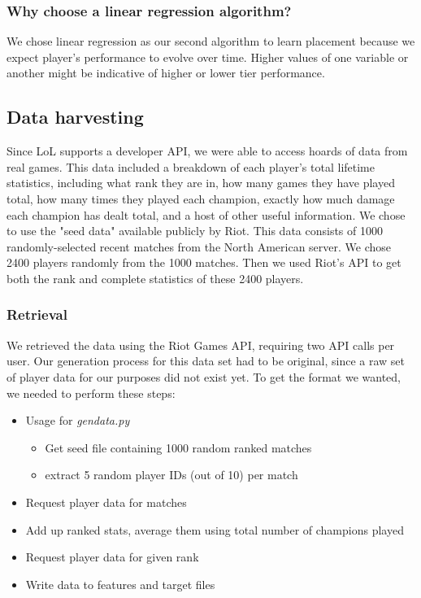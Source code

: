 \documentclass{article} %
\begin{document}
\subsubsection{Why choose a linear regression algorithm?}
We chose linear regression as our second algorithm to learn placement because we expect player's performance to evolve over time. Higher values of one variable or another might be indicative of higher or lower tier performance.

\subsection{Data harvesting}
Since LoL supports a developer API, we were able to access hoards of data from real games. This data included a breakdown of each player's total lifetime statistics, including what rank they are in, how many games they have played total, how many times they played each champion, exactly how much damage each champion has dealt total, and a host of other useful information. We chose to use the "seed data" available publicly by Riot. This data consists of 1000 randomly-selected recent matches from the North American server. We chose 2400 players randomly from the 1000 matches. Then we used Riot's API to get both the rank and complete statistics of these 2400 players.

\subsubsection{Retrieval}
We retrieved the data using the Riot Games API, requiring two API calls per user. Our generation process for this data set had to be original, since a raw set of player data for our purposes did not exist yet. To get the format we wanted, we needed to perform these steps:
\begin{itemize}
  \item Usage for \textit{gendata.py}
  \begin{itemize}
    \item Get seed file containing 1000 random ranked matches
    \item extract 5 random player IDs (out of 10) per match
  \end{itemize}
  \item Request player data for matches
  \item Add up ranked stats, average them using total number of champions played
  \item Request player data for given rank
  \item Write data to features and target files
\end{itemize}
\end{document}
